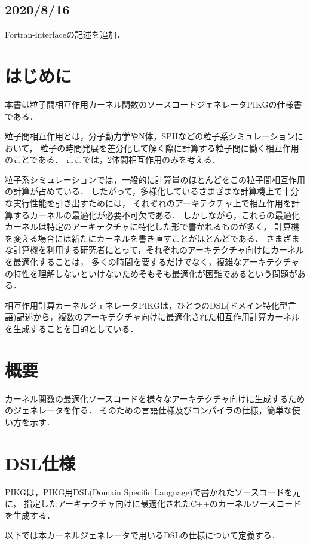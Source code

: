 \documentclass{article}
\begin{document}
\subsection{2020/8/16}
Fortran-interfaceの記述を追加．

\section{はじめに}
本書は粒子間相互作用カーネル関数のソースコードジェネレータPIKGの仕様書である．

粒子間相互作用とは，分子動力学やN体，SPHなどの粒子系シミュレーションにおいて，
粒子の時間発展を差分化して解く際に計算する粒子間に働く相互作用のことである．
ここでは，2体間相互作用のみを考える．

粒子系シミュレーションでは，一般的に計算量のほとんどをこの粒子間相互作用の計算が占めている．
したがって，多様化しているさまざまな計算機上で十分な実行性能を引き出すためには，
それぞれのアーキテクチャ上で相互作用を計算するカーネルの最適化が必要不可欠である．
しかしながら，これらの最適化カーネルは特定のアーキテクチャに特化した形で書かれるものが多く，
計算機を変える場合には新たにカーネルを書き直すことがほとんどである．
さまざまな計算機を利用する研究者にとって，それぞれのアーキテクチャ向けにカーネルを最適化することは，
多くの時間を要するだけでなく，複雑なアーキテクチャの特性を理解しないといけないためそもそも最適化が困難であるという問題がある．

相互作用計算カーネルジェネレータPIKGは，ひとつのDSL(ドメイン特化型言語)記述から，複数のアーキテクチャ向けに最適化された相互作用計算カーネルを生成することを目的としている．

\section{概要}
カーネル関数の最適化ソースコードを様々なアーキテクチャ向けに生成するためのジェネレータを作る．
そのための言語仕様及びコンパイラの仕様，簡単な使い方を示す．

\section{DSL仕様}
PIKGは，PIKG用DSL(Domain Specific Language)で書かれたソースコードを元に，
指定したアーキテクチャ向けに最適化されたC++のカーネルソースコードを生成する．

以下では本カーネルジェネレータで用いるDSLの仕様について定義する．
\end{document}
